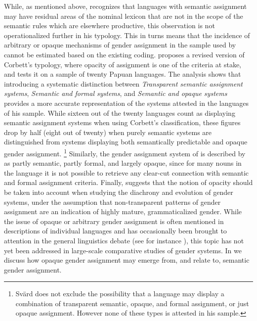 \documentclass[output=collectionpaper]{langsci/langscibook}
\begin{document}
While, as mentioned above, \cite{Corbett2013b} recognizes that languages with semantic assignment may have residual areas of the nominal lexicon that are not in the scope of the semantic rules which are elsewhere productive, this observation is not operationalized further in his typology. This in turns means that the incidence of arbitrary or opaque mechanisms of gender assignment in the sample used by \cite{Corbett2013b} cannot be estimated based on the existing coding.  proposes a revised version of Corbett's typology, where opacity of assignment is one of the criteria at stake, and tests it on a sample of twenty Papuan languages. The analysis shows that introducing a systematic distinction between \emph{Transparent semantic assignment systems}, \emph{Semantic and formal systems}, and \emph{Semantic and opaque systems} provides a more accurate representation of the systems attested in the languages of his sample. While sixteen out of the twenty languages count as displaying semantic assignment systems when using Corbett's classification, these figures drop by half (eight out of twenty) when purely semantic systems are distinguished from systems displaying both semantically predictable and opaque gender assignment.%
\footnote{
Svärd does not exclude the possibility that a language may display a combination of transparent semantic, opaque, and formal assignment, or just opaque assignment. However none of these types is attested in his sample.
} %
Similarly, the gender assignment system of  is described by  as partly semantic, partly formal, and largely opaque, since for many nouns in the language it is not possible to retrieve any clear-cut connection with semantic and formal assignment criteria. Finally,  suggests that the notion of opacity should be taken into account when studying the diachrony and evolution of gender systems, under the assumption that non-transparent patterns of gender assignment are an indication of highly mature, grammaticalized gender. While the issue of opaque or arbitrary gender assignment is often mentioned in descriptions of individual languages and has occasionally been brought to attention in the general linguistics debate (see for instance \citealt{Dahl2000a}), this topic has not yet been addressed in large-scale comparative studies of gender systems. In  we discuss how opaque gender assignment may emerge from, and relate to, semantic gender assignment.
\end{document}
